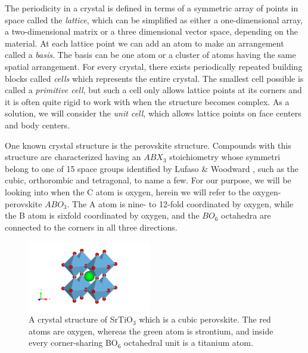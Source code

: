 The periodicity in a crystal is defined in terms of a symmetric array of points in space called the \textit{lattice}, which can be simplified as either a one-dimensional array, a two-dimensional matrix or a three dimensional vector space, depending on the material. At each lattice point we can add an atom to make an arrangement called a \textit{basis}. The basis can be one atom or a cluster of atoms having the same spatial arrangement. For every crystal, there exists periodically repeated building blocks called \textit{cells} which represents the entire crystal. The smallest cell possible is called a \textit{primitive cell}, but such a cell only allows lattice points at its corners and it is often quite rigid to work with when the structure becomes complex. As a solution, we will consider the \textit{unit cell}, which allows lattice points on face centers and body centers.

\newpage



\newpage
One known crystal structure is the perovskite structure. Compounds with this structure are characterized having an $ABX_3$ stoichiometry whose symmetri belong to one of 15 space groups identified by Lufaso \& Woodward \cite{Lufaso2001}, such as the cubic, orthorombic and tetragonal, to name a few. For our purpose, we will be looking into when the C atom is oxygen, herein we will refer to the oxygen-perovskite $ABO_3$. The A atom is nine- to 12-fold coordinated by oxygen, while the B atom is sixfold coordinated by oxygen, and the $BO_6$ octahedra are connected to the corners in all three directions.

\begin{figure}
  \centering
  \includegraphics[width=0.48\textwidth]{theory/figures/SrTiO3_mp-5229_primitive.pdf}
  \caption{A crystal structure of SrTiO$_3$ which is a cubic perovskite. The red atoms are oxygen, whereas the green atom is strontium, and inside every corner-sharing BO$_6$ octahedral unit is a titanium atom.}
  \label{fig:pic}
\end{figure}

